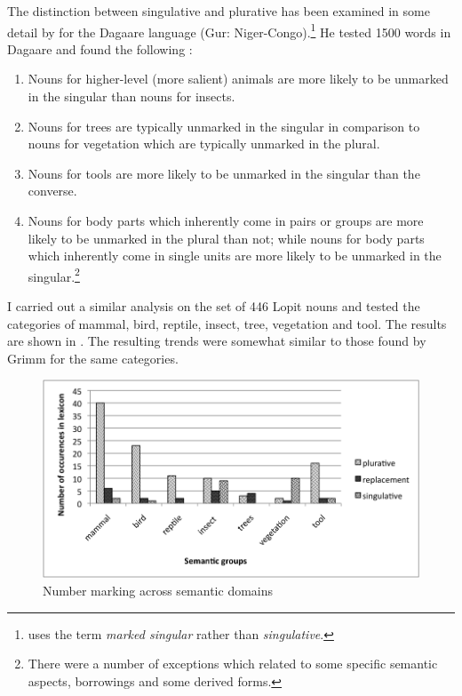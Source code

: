\documentclass[output=paper]{langsci/langscibook}
\begin{document}
The distinction between singulative and plurative has been examined in some detail by \citet{Grimm2012} for the Dagaare language (Gur: Niger-Congo).\footnote{ \citet{Grimm2012} uses the term \textit{marked singular} rather than \textit{singulative}.} He tested 1500 words in Dagaare and found the following \citep[50]{Grimm2012}:

\begin{enumerate}[label=\roman*.]
\item Nouns for higher-level (more salient) animals are more likely to be unmarked in the singular than nouns for insects. 
\item Nouns for trees are typically unmarked in the singular in comparison to nouns for vegetation which are typically unmarked in the plural. 
\item Nouns for tools are more likely to be unmarked in the singular than the converse. 
\item Nouns for body parts which inherently come in pairs or groups are more likely to be unmarked in the plural than not; while nouns for body parts which inherently come in single units are more likely to be unmarked in the singular.\footnote{There were a number of exceptions which related to some specific semantic aspects, borrowings and some derived forms.}
\end{enumerate}

I carried out a similar analysis on the set of 446 Lopit nouns and tested the categories of mammal, bird, reptile, insect, tree, vegetation and tool. The results are shown in . The resulting trends were somewhat similar to those found by Grimm for the same categories. 

\begin{figure}
\includegraphics[width=\textwidth]{figures/moodie-fig-1.png}
\caption{Number marking across semantic domains}
\label{fig:moodie:1}
\end{figure}
\end{document}
